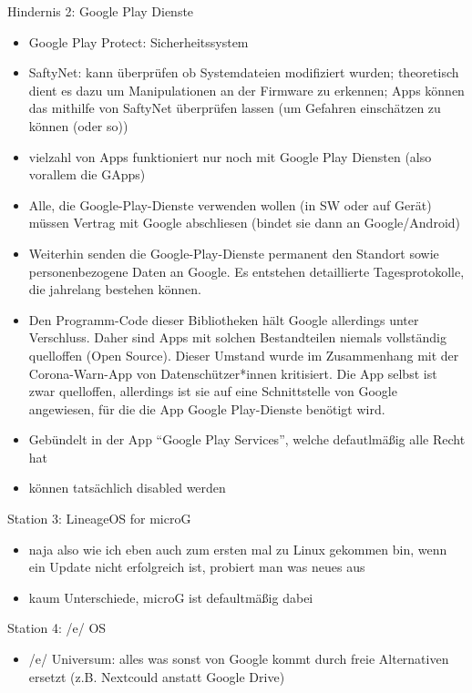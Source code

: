 \documentclass[14pt,compress,usenames,dvipsnames,aspectratio=169]{beamer}
\begin{document}
\begin{frame}{Hindernis 2: Google Play Dienste}
{\begin{itemize}
            \item Google Play Protect: Sicherheitssystem
            \item SaftyNet: kann überprüfen ob Systemdateien modifiziert wurden; theoretisch dient es dazu um Manipulationen an der Firmware zu erkennen; Apps können das mithilfe von SaftyNet überprüfen lassen (um Gefahren einschätzen zu können (oder so))
            \item vielzahl von Apps funktioniert nur noch mit Google Play Diensten (also vorallem die GApps)
            \item Alle, die Google-Play-Dienste verwenden wollen (in SW oder auf Gerät) müssen Vertrag mit Google abschliesen (bindet sie dann an Google/Android)
            \item Weiterhin senden die Google-Play-Dienste permanent den Standort sowie personenbezogene Daten an Google. Es entstehen detaillierte Tagesprotokolle, die jahrelang bestehen können.
            \item Den Programm-Code dieser Bibliotheken hält Google allerdings unter Verschluss. Daher sind Apps mit solchen Bestandteilen niemals vollständig quelloffen (Open Source). Dieser Umstand wurde im Zusammenhang mit der Corona-Warn-App von Datenschützer*innen kritisiert. Die App selbst ist zwar quelloffen, allerdings ist sie auf eine Schnittstelle von Google angewiesen, für die die App Google Play-Dienste benötigt wird.
            \item Gebündelt in der App “Google Play Services”, welche defautlmäßig alle Recht hat
            \item können tatsächlich disabled werden
        \end{itemize}
    }

\end{frame}

\begin{frame}{Station 3: LineageOS for microG}
    \begin{itemize}
        \item naja also wie ich eben auch zum ersten mal zu Linux gekommen bin, wenn ein Update nicht erfolgreich ist, probiert man was neues aus
        \item kaum Unterschiede, microG ist defaultmäßig dabei
    \end{itemize}

\end{frame}

\begin{frame}{Station 4: /e/ OS}
    \begin{itemize}
        \item /e/ Universum: alles was sonst von Google kommt durch freie Alternativen ersetzt (z.B. Nextcould anstatt Google Drive)
    \end{itemize}

\end{frame}
\end{document}
